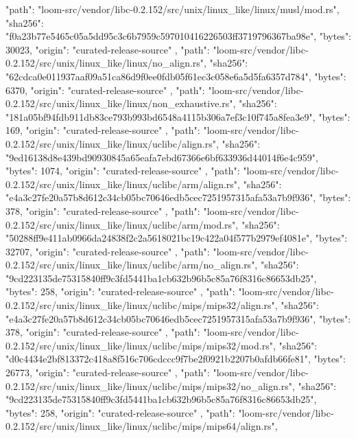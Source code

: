 {{      "path": "loom-src/vendor/libc-0.2.152/src/unix/linux_like/linux/musl/mod.rs",
      "sha256": "f0a23b77e5465c05a5dd95c3c6b7959c597010416226503ff3719796367ba98e",
      "bytes": 30023,
      "origin": "curated-release-source"
    },
    {
      "path": "loom-src/vendor/libc-0.2.152/src/unix/linux_like/linux/no_align.rs",
      "sha256": "62cdca0e011937aaf09a51ca86d9f0ee0fdb05f61ec3c058e6a5d5fa6357d784",
      "bytes": 6370,
      "origin": "curated-release-source"
    },
    {
      "path": "loom-src/vendor/libc-0.2.152/src/unix/linux_like/linux/non_exhaustive.rs",
      "sha256": "181a05bf94fdb911db83ce793b993bd6548a4115b306a7ef3c10f745a8fea3e9",
      "bytes": 169,
      "origin": "curated-release-source"
    },
    {
      "path": "loom-src/vendor/libc-0.2.152/src/unix/linux_like/linux/uclibc/align.rs",
      "sha256": "9ed16138d8e439bd90930845a65eafa7ebd67366e6bf633936d44014f6e4c959",
      "bytes": 1074,
      "origin": "curated-release-source"
    },
    {
      "path": "loom-src/vendor/libc-0.2.152/src/unix/linux_like/linux/uclibc/arm/align.rs",
      "sha256": "e4a3c27fe20a57b8d612c34cb05bc70646edb5cec7251957315afa53a7b9f936",
      "bytes": 378,
      "origin": "curated-release-source"
    },
    {
      "path": "loom-src/vendor/libc-0.2.152/src/unix/linux_like/linux/uclibc/arm/mod.rs",
      "sha256": "50288ff9e411ab0966da24838f2c2a5618021bc19c422a04f577b2979ef4081e",
      "bytes": 32707,
      "origin": "curated-release-source"
    },
    {
      "path": "loom-src/vendor/libc-0.2.152/src/unix/linux_like/linux/uclibc/arm/no_align.rs",
      "sha256": "9cd223135de75315840ff9c3fd5441ba1cb632b96b5c85a76f8316c86653db25",
      "bytes": 258,
      "origin": "curated-release-source"
    },
    {
      "path": "loom-src/vendor/libc-0.2.152/src/unix/linux_like/linux/uclibc/mips/mips32/align.rs",
      "sha256": "e4a3c27fe20a57b8d612c34cb05bc70646edb5cec7251957315afa53a7b9f936",
      "bytes": 378,
      "origin": "curated-release-source"
    },
    {
      "path": "loom-src/vendor/libc-0.2.152/src/unix/linux_like/linux/uclibc/mips/mips32/mod.rs",
      "sha256": "d0c4434e2bf813372c418a8f516c706cdccc9f7be2f0921b2207b0afdb66fe81",
      "bytes": 26773,
      "origin": "curated-release-source"
    },
    {
      "path": "loom-src/vendor/libc-0.2.152/src/unix/linux_like/linux/uclibc/mips/mips32/no_align.rs",
      "sha256": "9cd223135de75315840ff9c3fd5441ba1cb632b96b5c85a76f8316c86653db25",
      "bytes": 258,
      "origin": "curated-release-source"
    },
    {
      "path": "loom-src/vendor/libc-0.2.152/src/unix/linux_like/linux/uclibc/mips/mips64/align.rs",
}}
